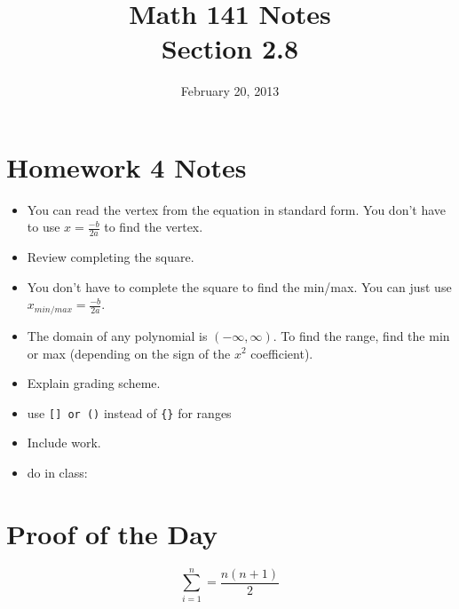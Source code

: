 \documentclass{exam}
\title{Math 141 Notes \\ Section 2.8}
\date{February 20, 2013}
\begin{document}
\maketitle
\tableofcontents

\section{Homework 4 Notes}
\begin{itemize}
  \item You can read the vertex from the equation in standard form.  You don't have to use $x = \frac{-b}{2a}$ to
    find the vertex.

  \item Review completing the square.

  \item You don't have to complete the square to find the min/max.  You can just use $x_{min/max} = \frac{-b}{2a}$.  

  \item The domain of any polynomial is $(-\infty, \infty)$.  To find the range, find the min or max (depending on the
    sign of the $x^2$ coefficient).

  \item Explain grading scheme.

  \item use \verb+[] or ()+ instead of \verb+{}+ for ranges

  \item Include work.

  \item do in class:
    
\end{itemize}

\section{Proof of the Day}
\[
  \sum_{i = 1}^n = \frac{n(n + 1)}{2}
\]
\end{document}
